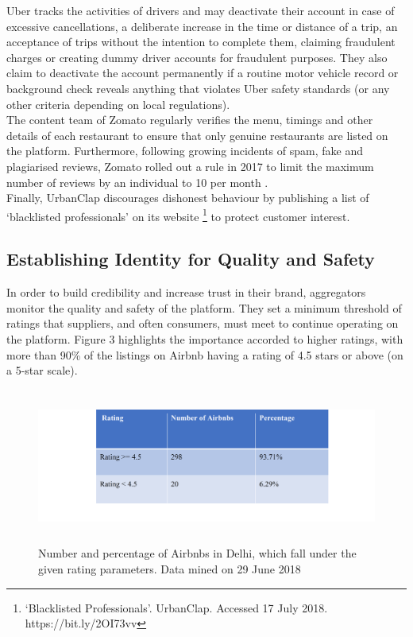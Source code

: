 \documentclass[a4paper, 12pt]{article}
\begin{document}
                  Uber tracks the activities of drivers and may deactivate their account in case of excessive cancellations, a deliberate increase in the time or distance of a trip, an acceptance of trips without the intention to complete them, claiming fraudulent charges or creating dummy driver accounts for fraudulent purposes. They also claim to deactivate the account permanently if a routine motor vehicle record or background check reveals anything that violates Uber safety standards (or any other criteria depending on local regulations). \\

The content team of Zomato regularly verifies the menu, timings and other details of each restaurant to ensure that only genuine restaurants are listed on the platform. Furthermore, following growing incidents of spam, fake and plagiarised reviews, Zomato rolled out a rule in 2017 to limit the maximum number of reviews by an individual to 10 per month \parencite{Narang17}. \\

Finally, UrbanClap discourages dishonest behaviour by publishing a list of ‘blacklisted professionals’ on its website \footnote{‘Blacklisted Professionals’. UrbanClap. Accessed 17 July 2018. https://bit.ly/2OI73vv}  to protect customer interest. 
               


     
                    \subsection{Establishing Identity for Quality and Safety }
                    
                    In order to build credibility and increase trust in their brand, aggregators monitor the quality and safety of the platform. They set a minimum threshold of ratings that suppliers, and often consumers, must meet to continue operating on the platform. Figure 3 highlights the importance accorded to higher ratings, with more than 90\% of the listings on Airbnb having a rating of 4.5 stars or above (on a 5-star scale). \\

\begin{figure}[h!]
\centering
\vspace{20pt}%
\includegraphics[height=2in]{figure2.png}
\caption{Number and percentage of Airbnbs in Delhi, which fall under the given rating parameters. Data mined on 29 June 2018}
\end{figure}
\end{document}
